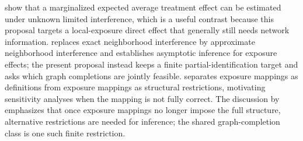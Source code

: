 \documentclass[11pt]{article}
\theoremstyle{definition}
\theoremstyle{plain}
\theoremstyle{remark}
\begin{document}
\citet{SavjeAronowHudgens2021} show that a marginalized expected average treatment effect can be estimated under unknown limited interference, which is a useful contrast because this proposal targets a local-exposure direct effect that generally still needs network information.  \citet{Leung2022} replaces exact neighborhood interference by approximate neighborhood interference and establishes asymptotic inference for exposure effects; the present proposal instead keeps a finite partial-identification target and asks which graph completions are jointly feasible.  \citet{Savje2024} separates exposure mappings as definitions from exposure mappings as structural restrictions, motivating sensitivity analyses when the mapping is not fully correct.  The discussion by \citet{Leung2024Discussion} emphasizes that once exposure mappings no longer impose the full structure, alternative restrictions are needed for inference; the shared graph-completion class is one such finite restriction.
\end{document}
